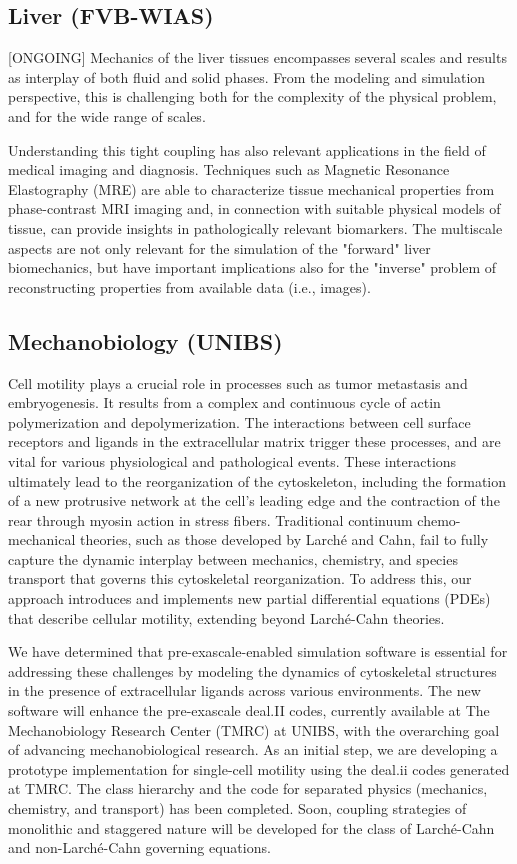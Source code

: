 \documentclass[a4paper,12pt]{article}
\begin{document}
\subsection{Liver (FVB-WIAS)}
[ONGOING]
Mechanics of the liver tissues encompasses several scales and results as interplay of both fluid and solid phases.
From the modeling and simulation perspective, this is challenging both for the complexity of the physical problem, and for the wide range of scales.

Understanding this tight coupling has also relevant applications in the field of medical imaging and diagnosis.
Techniques such as Magnetic Resonance Elastography (MRE) are able to characterize tissue mechanical properties from phase-contrast MRI imaging and, in connection with suitable physical models of tissue, can provide insights in pathologically relevant biomarkers.
The multiscale aspects are not only relevant for the simulation of the "forward" liver biomechanics, but have important implications also for the "inverse" problem of reconstructing properties from available data (i.e., images).

\subsection{Mechanobiology (UNIBS)}
Cell motility plays a crucial role in processes such as tumor metastasis and embryogenesis.
It results from a complex and continuous cycle of actin polymerization and depolymerization.
The interactions between cell surface receptors and ligands in the extracellular matrix trigger these processes, and are vital for various physiological and pathological events.
These interactions ultimately lead to the reorganization of the cytoskeleton, including the formation of a new protrusive network at the cell's leading edge and the contraction of the rear through myosin action in stress fibers.
Traditional continuum chemo-mechanical theories, such as those developed by Larché and Cahn, fail to fully capture the dynamic interplay between mechanics, chemistry, and species transport that governs this cytoskeletal reorganization.
To address this, our approach introduces and implements new partial differential equations (PDEs) that describe cellular motility, extending beyond Larché-Cahn theories.

We have determined that pre-exascale-enabled simulation software is essential for addressing these challenges by modeling the dynamics of cytoskeletal structures in the presence of extracellular ligands across various environments.
The new software will enhance the pre-exascale deal.II codes, currently available at The Mechanobiology Research Center (TMRC) at UNIBS, with the overarching goal of advancing mechanobiological research.
As an initial step, we are developing a prototype implementation for single-cell motility using the deal.ii codes generated at TMRC.
The class hierarchy and the code for separated physics (mechanics, chemistry, and transport) has been completed.
Soon, coupling strategies of monolithic and staggered nature will be developed for the class of Larché-Cahn and non-Larché-Cahn governing equations.
\end{document}
